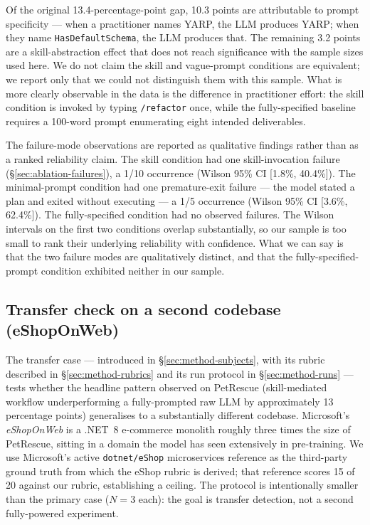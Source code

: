 \documentclass[journal]{IEEEtran}
\begin{document}
Of the original 13.4-percentage-point gap, 10.3 points are
attributable to prompt specificity --- when a practitioner names
YARP, the LLM produces YARP; when they name
\texttt{HasDefaultSchema}, the LLM produces that. The remaining
3.2 points are a skill-abstraction effect that does not reach
significance with the sample sizes used here. We do not claim the
skill and vague-prompt conditions are equivalent; we report only
that we could not distinguish them with this sample. What is more
clearly observable in the data is the difference in practitioner
effort: the skill condition is invoked by typing \texttt{/refactor}
once, while the fully-specified baseline requires a 100-word prompt
enumerating eight intended deliverables.

The failure-mode observations are reported as qualitative findings
rather than as a ranked reliability claim. The skill condition had
one skill-invocation failure (\S\ref{sec:ablation-failures}), a
1/10 occurrence (Wilson 95\% CI [1.8\%, 40.4\%]). The minimal-prompt
condition had one premature-exit failure --- the model stated a
plan and exited without executing --- a 1/5 occurrence (Wilson 95\%
CI [3.6\%, 62.4\%]). The fully-specified condition had no observed
failures. The Wilson intervals on the first two conditions overlap
substantially, so our sample is too small to rank their underlying
reliability with confidence. What we can say is that the two
failure modes are qualitatively distinct, and that the
fully-specified-prompt condition exhibited neither in our sample.

\subsection{Transfer check on a second codebase (eShopOnWeb)}
\label{sec:results-transfer}

The transfer case --- introduced in
\S\ref{sec:method-subjects}, with its rubric described in
\S\ref{sec:method-rubrics} and its run protocol in
\S\ref{sec:method-runs} --- tests whether the headline pattern
observed on PetRescue (skill-mediated workflow underperforming a
fully-prompted raw LLM by approximately 13 percentage points)
generalises to a substantially different codebase. Microsoft's
\textit{eShopOnWeb} is a .NET~8 e-commerce monolith roughly three
times the size of PetRescue, sitting in a domain the model has seen
extensively in pre-training. We use Microsoft's active
\texttt{dotnet/eShop} microservices reference as the third-party
ground truth from which the eShop rubric is derived; that reference
scores 15 of 20 against our rubric, establishing a ceiling. The
protocol is intentionally smaller than the primary case ($N{=}3$
each): the goal is transfer detection, not a second fully-powered
experiment.
\end{document}
